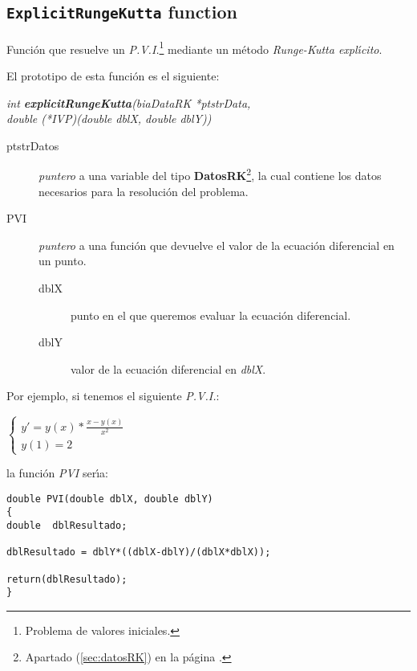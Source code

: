 \subsection{\texttt{ExplicitRungeKutta} function}

Funci\'on que resuelve un \emph{P.V.I.}\footnote{Problema de valores 
iniciales.} mediante un m\'etodo \emph{Runge-Kutta expl\'{\i}cito}.\newline

El prototipo de esta funci\'on es el siguiente:

\begin{center}
\emph{int \textbf{explicitRungeKutta}(biaDataRK *ptstrData,\\
double (*IVP)(double dblX, double dblY))}
\end{center} 

\begin{description}
\item[ptstrDatos] \emph{puntero} a una variable del tipo 
\textbf{DatosRK}\footnote{Apartado (\ref{sec:datosRK}) en la p\'agina 
\pageref{sec:datosRK}.}, la cual contiene los datos necesarios para
la resoluci\'on del problema.
\item[PVI] \emph{puntero} a una funci\'on que devuelve el valor de la
ecuaci\'on diferencial en un punto.
\begin{description}
	\item[dblX] punto en el que queremos evaluar la ecuaci\'on diferencial.
	\item[dblY] valor de la ecuaci\'on diferencial en \emph{dblX}.
\end{description}
\end{description}

Por ejemplo, si tenemos el siguiente \emph{P.V.I.}:

\begin{center}
$
\left \{ \begin{array}{l}
y' = y(x) * \frac{x-y(x)}{x^2} \\
y(1) = 2
\end{array} \right.
$
\end{center}

la funci\'on \emph{PVI} ser\'{\i}a:

\begin{verbatim}
double PVI(double dblX, double dblY)
{
double  dblResultado;

dblResultado = dblY*((dblX-dblY)/(dblX*dblX));

return(dblResultado);
}
\end{verbatim}

